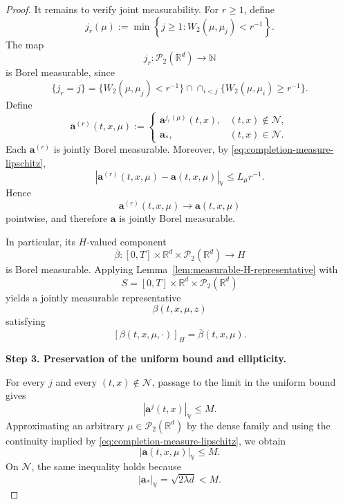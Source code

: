 \documentclass[12pt,oneside, reqno]{amsart}
\numberwithin{equation}{section}
\begin{document}
\begin{proof}
		It remains to verify joint measurability. For \(r\geq1\), define
		\[
		j_r(\mu)
		:=
		\min
		\left\{
		j\geq1:
		W_2(\mu,\mu_j)<r^{-1}
		\right\}.
		\]
		The map
		\[
		j_r:
		\mathcal P_2(\mathbb R^d)
		\longrightarrow
		\mathbb N
		\]
		is Borel measurable, since
		\[
		\{j_r=j\}
		=
		\{W_2(\mu,\mu_j)<r^{-1}\}
		\cap
		\cap_{i<j}
		\{W_2(\mu,\mu_i)\geq r^{-1}\}.
		\]
		Define
		\[
		\mathbf a^{(r)}(t,x,\mu)
		:=
		\begin{cases}
			\mathbf a^{j_r(\mu)}(t,x),
			&(t,x)\notin\mathcal N,\\
			\mathbf a_\ast,
			&(t,x)\in\mathcal N.
		\end{cases}
		\]
		Each \(\mathbf a^{(r)}\) is jointly Borel measurable. Moreover,
		by \eqref{eq:completion-measure-lipschitz},
		\[
		\left|
		\mathbf a^{(r)}(t,x,\mu)
		-
		\mathbf a(t,x,\mu)
		\right|_{\mathbb V}
		\leq
		L_\mu r^{-1}.
		\]
		Hence
		\[
		\mathbf a^{(r)}(t,x,\mu)
		\longrightarrow
		\mathbf a(t,x,\mu)
		\]
		pointwise, and therefore \(\mathbf a\) is jointly Borel measurable.
		
		In particular, its \(H\)-valued component
		\[
		\overline\beta:
		[0,T]\times\mathbb R^d\times
		\mathcal P_2(\mathbb R^d)
		\longrightarrow H
		\]
		is Borel measurable. Applying
		Lemma~\ref{lem:measurable-H-representative} with
		\[
		S
		=
		[0,T]\times\mathbb R^d\times
		\mathcal P_2(\mathbb R^d)
		\]
		yields a jointly measurable representative
		\[
		\beta(t,x,\mu,z)
		\]
		satisfying
		\[
		[\beta(t,x,\mu,\cdot)]_H
		=
		\overline\beta(t,x,\mu).
		\]
		
		
		\textbf{Step 3. Preservation of the uniform bound and ellipticity.}
		
		For every \(j\) and every
		\((t,x)\notin\mathcal N\), passage to the limit in the uniform
		bound gives
		\[
		|\mathbf a^j(t,x)|_{\mathbb V}
		\leq
		M.
		\]
		Approximating an arbitrary
		\(\mu\in\mathcal P_2(\mathbb R^d)\) by the dense family and using
		the continuity implied by
		\eqref{eq:completion-measure-lipschitz}, we obtain
		\begin{equation}
			\label{eq:completion-uniform-bound}
			|\mathbf a(t,x,\mu)|_{\mathbb V}
			\leq
			M.
		\end{equation}
		On \(\mathcal N\), the same inequality holds because
		\[
		|\mathbf a_\ast|_{\mathbb V}
		=
		\sqrt{2\lambda d}
		<
		M.
		\]
		

\end{proof}
\end{document}
